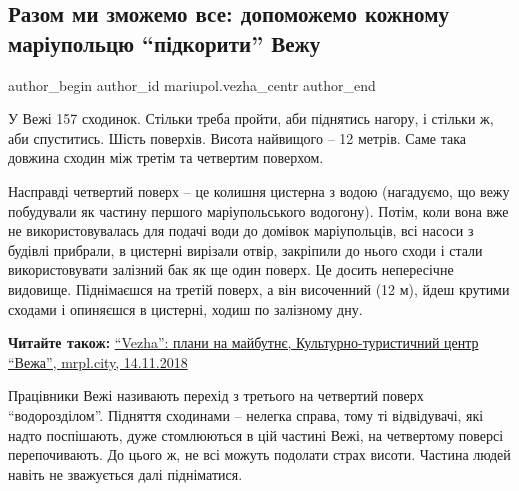  
 
 
 
 
 
\subsection{Разом ми зможемо все: допоможемо кожному маріупольцю \enquote{підкорити} Вежу}
\label{sec:19_02_2019.stz.news.ua.mrpl_city.2.dopomogty_pidkoryty_vezhu}
 
\ifcmt
 author_begin
   author_id mariupol.vezha_centr
 author_end
\fi

У Вежі 157 сходинок. Стільки треба пройти, аби піднятись нагору, і стільки ж,
аби спуститись. Шість поверхів. Висота найвищого – 12 метрів. Саме така довжина
сходин між третім та четвертим поверхом.

Насправді четвертий поверх – це колишня цистерна з водою (нагадуємо, що вежу
побудували як частину першого маріупольського водогону). Потім, коли вона вже
не використовувалась для подачі води до домівок маріупольців, всі насоси з
будівлі прибрали, в цистерні вирізали отвір, закріпили до нього сходи і стали
використовувати залізний бак як ще один поверх. Це досить непересічне видовище.
Піднімаєшся на третій поверх, а він височенний (12 м), йдеш крутими сходами і
опиняєшся в цистерні, ходиш по залізному дну.

\textbf{Читайте також:} \href{https://mrpl.city/blogs/view/vezha-plani-na-majbutne}{%
\enquote{Vezha}: плани на майбутнє, Культурно-туристичний центр \enquote{Вежа}, mrpl.city, 14.11.2018}

Працівники Вежі називають перехід з третього на четвертий поверх
\enquote{водорозділом}. Підняття сходинами – нелегка справа, тому ті відвідувачі, які
надто поспішають, дуже стомлюються в цій частині Вежі, на четвертому поверсі
перепочивають. До цього ж, не всі можуть подолати страх висоти. Частина людей
навіть не зважується далі підніматися.

